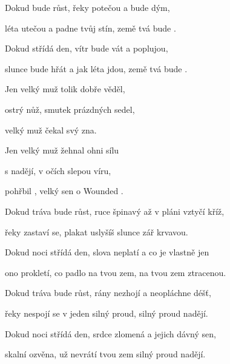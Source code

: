 

\zs
Dokud  bude růst,
řeky potečou a  bude dým,

léta utečou a  padne tvůj stín,
země tvá bude .

Dokud  střídá den,
vítr bude vát a  poplujou,

slunce bude hřát a  jak léta jdou,
země tvá bude .
\ks

\zr
Jen  velký muž tolik dobře věděl,

 ostrý nůž, smutek prázdných sedel,

 velký muž čekal svý zna.

Jen  velký muž žehnal ohni sílu

s  nadějí, v očích slepou víru,

 pohřbil , velký sen o Wounded .
\kr

\zs
Dokud tráva bude růst,
ruce špinavý až v pláni vztyčí kříž,

řeky zastaví se, plakat uslyšíš
slunce zář krvavou.

Dokud noci střídá den,
slova neplatí a co je vlastně jen

ono prokletí, co padlo na tvou zem,
na tvou zem ztracenou.
\ks

\zr  \kr

\zs
Dokud tráva bude růst,
rány nezhojí a neopláchne déšť,

řeky nespojí se v jeden silný proud,
silný proud nadějí.

Dokud noci střídá den,
srdce zlomená a jejich dávný sen,

skalní ozvěna, už nevrátí tvou zem
silný proud nadějí.
\ks

\zr  \kr

\kp






